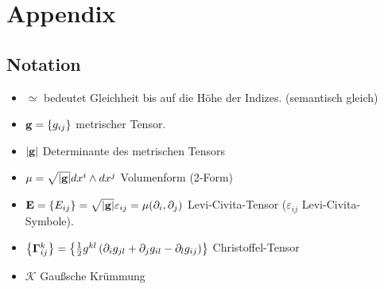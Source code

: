 \documentclass[a4paper,11pt]{scrartcl}
\begin{document}
\section{Appendix}
\subsection{Notation}
\begin{itemize}
  \item \( \simeq \) bedeutet Gleichheit bis auf die Höhe der Indizes. (semantisch gleich)
  \item \( \mathbf{g} = \left\{ g_{ij} \right\} \) metrischer Tensor.
  \item \( \left| \mathbf{g} \right| \) Determinante des metrischen Tensors
  \item \( \mu = \sqrt{\left| \mathbf{g} \right|} dx^{i}\wedge dx^{j} \) Volumenform (2-Form)
  \item \( \mathbf{E} = \left\{ E_{ij} \right\} = \sqrt{\left| \mathbf{g} \right|}\varepsilon_{ij} = \mu(\partial_{i},\partial_{j})\)
          Levi-Civita-Tensor (\( \varepsilon_{ij} \) Levi-Civita-Symbole).
  \item \( \left\{ \mathbf{\Gamma}{_{ij}^{k}} \right\} 
            = \left\{ \frac{1}{2} g^{kl}\left(\partial_{i}g_{jl} + \partial_{j}g_{il} - \partial_{l}g_{ij}  \right) \right\}\)
           Christoffel-Tensor
  \item \( \mathcal{K} \) Gaußsche Krümmung
\end{itemize}
\end{document}
